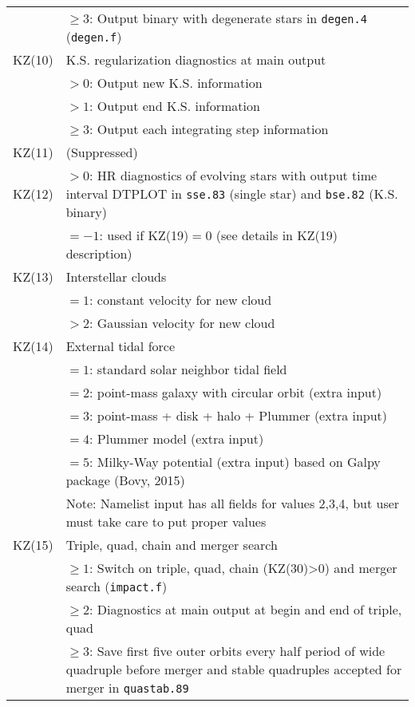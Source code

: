 \begin{longtable}{@{}p{1.5cm}p{13.0cm}}
        & $\ge 3$: Output binary with degenerate stars in \texttt{degen.4} (\texttt{degen.f}) \\
KZ(10)  & K.S. regularization diagnostics at main output \\
        & $>0$: Output new K.S. information \\
        & $>1$: Output end K.S. information \\
        & $\ge 3$: Output each integrating step information\\
KZ(11)  & (Suppressed) \\
KZ(12)  & $>0$: HR diagnostics of evolving stars with output time interval DTPLOT in \texttt{sse.83} (single star) and \texttt{bse.82} (K.S. binary) \\
        & $=-1$: used if KZ(19)$=0$ (see details in KZ(19) description)\\
KZ(13)  & Interstellar clouds \\
        & $=1$: constant velocity for new cloud\\
        & $>2$: Gaussian velocity for new cloud\\
KZ(14)  & External tidal force \\
        & $=1$: standard solar neighbor tidal field\\
        & $=2$: point-mass galaxy with circular orbit (extra input) \\
        & $=3$: point-mass + disk + halo + Plummer (extra input) \\
        & $=4$: Plummer model (extra input) \\
        & $=5$: Milky-Way potential (extra input) based on Galpy package (Bovy, 2015) \\
        & Note: Namelist input has all fields for values 2,3,4, but user must take care to put proper values \\
KZ(15)  & Triple, quad, chain and merger search \\
        & $\ge 1$: Switch on triple, quad, chain (KZ(30)>0) and merger search (\texttt{impact.f}) \\
        & $\ge 2$: Diagnostics at main output at begin and end of triple, quad \\
        & $\ge 3$: Save first five outer orbits every half period of wide quadruple before merger and stable quadruples accepted for merger in \texttt{quastab.89} \\

\end{longtable}
